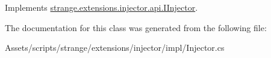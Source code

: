 Implements \hyperlink{interfacestrange_1_1extensions_1_1injector_1_1api_1_1_i_injector_ab6c185a183b27708e38c4954195fe591}{strange.\-extensions.\-injector.\-api.\-I\-Injector}.



The documentation for this class was generated from the following file\-:\begin{DoxyCompactItemize}
\item 
Assets/scripts/strange/extensions/injector/impl/Injector.\-cs\end{DoxyCompactItemize}
